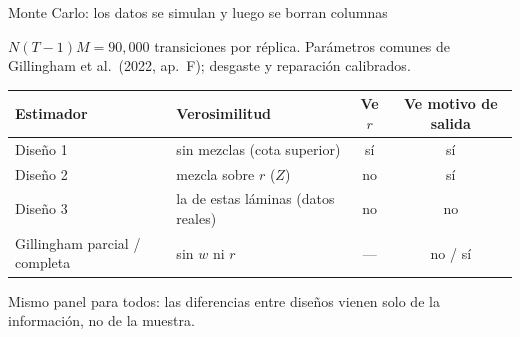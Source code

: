 \documentclass[aspectratio=169,11pt]{beamer}
\newcommand{\idea}[1]{\vspace{-0.3em}\begin{block}{}\centering\small #1\end{block}}
\begin{document}
\begin{frame}{Monte Carlo: los datos se simulan y luego se borran columnas}
  \centering
  \par\medskip
  {\small $N(T-1)M=90{,}000$ transiciones por réplica. Parámetros comunes de Gillingham
  et al.\ (2022, ap.\ F); desgaste y reparación calibrados.}
  \begin{center}\footnotesize
  \begin{tabular}{llcc}
    \toprule
    Estimador & Verosimilitud & Ve $r$ & Ve motivo de salida\\
    \midrule
    Diseño 1 & sin mezclas (cota superior) & sí & sí\\
    Diseño 2 & mezcla sobre $r$ ($Z$) & no & sí\\
    Diseño 3 & la de estas láminas (datos reales) & no & no\\
    Gillingham parcial / completa & sin $w$ ni $r$ & --- & no / sí\\
    \bottomrule
  \end{tabular}
  \end{center}
  \idea{Mismo panel para todos: las diferencias entre diseños vienen solo de la
  información, no de la muestra.}
\end{frame}
\end{document}
